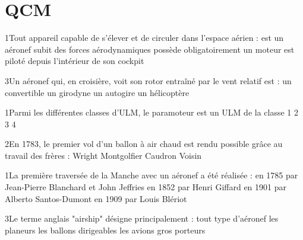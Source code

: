 \appendix
\section{QCM}
{1}{Tout appareil capable de s'élever et de circuler dans l'espace aérien :}
{est un aéronef}
{subit des forces aérodynamiques}
{possède obligatoirement un moteur}
{est piloté depuis l'intérieur de son cockpit}
{}

{3}{Un aéronef qui, en croisière, voit son rotor entraîné par le vent relatif est :}
{un convertible}
{un girodyne}
{un autogire}
{un hélicoptère}
{}

{1}{Parmi les différentes classes d'ULM, le paramoteur est un ULM de la classe}
{1}
{2}
{3}
{4}
{}

{2}{En 1783, le premier vol d'un ballon à air chaud est rendu possible grâce au travail des frères :}
{Wright}
{Montgolfier}
{Caudron}
{Voisin}
{}

{1}{La première traversée de la Manche avec un aéronef a été réalisée :}
{en 1785 par Jean-Pierre Blanchard et John Jeffries}
{en 1852 par Henri Giffard}
{en 1901 par Alberto Santos-Dumont}
{en 1909 par Louis Blériot}
{}

{3}{Le terme anglais "airship" désigne principalement :}
{tout type d'aéronef}
{les planeurs}
{les ballons dirigeables}
{les avions gros porteurs}
{}

 



